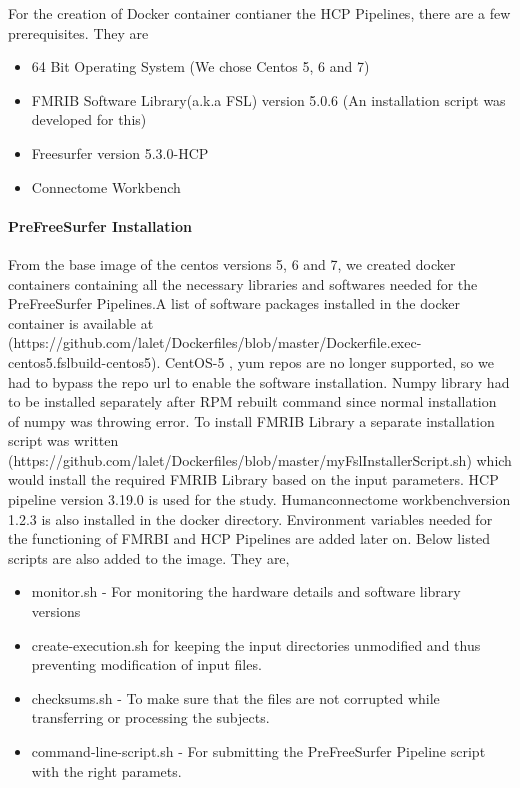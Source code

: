 \documentclass{article}
\begin{document}
For the creation of Docker container contianer the HCP Pipelines, there are a few prerequisites. They are

\begin{itemize}
  \item 64 Bit Operating System (We chose Centos 5, 6 and 7)
  \item FMRIB Software Library(a.k.a FSL) version 5.0.6 (An installation script was developed for this)
  \item Freesurfer version 5.3.0-HCP
  \item Connectome Workbench
\end{itemize}

\paragraph{PreFreeSurfer Installation}
From the base image of the centos versions 5, 6 and 7, we created docker containers containing all the necessary libraries and softwares needed for the PreFreeSurfer Pipelines.A list of software packages installed in the docker container is available at (https://github.com/lalet/Dockerfiles/blob/master/Dockerfile.exec-centos5.fslbuild-centos5). CentOS-5 , yum repos are no longer supported, so we had to bypass the repo url to enable the software installation. Numpy library had to be installed separately after RPM rebuilt command since normal installation of numpy was throwing error. To install FMRIB Library a separate installation script was written (https://github.com/lalet/Dockerfiles/blob/master/myFslInstallerScript.sh) which would install the required FMRIB Library based on the input parameters. HCP pipeline version 3.19.0 is used for the study. Humanconnectome workbenchversion 1.2.3 is also installed in the docker directory. Environment variables needed for the functioning of FMRBI and HCP Pipelines are added later on.
Below listed scripts are also added to the image. They are,
\begin{itemize}
  \item monitor.sh - For monitoring the hardware details and software library versions
  \item create-execution.sh for keeping the input directories unmodified and thus preventing modification of input files.
  \item checksums.sh - To make sure that the files are not corrupted while transferring or processing the subjects.
  \item command-line-script.sh - For submitting the PreFreeSurfer Pipeline script with the right paramets.
\end{itemize}
\end{document}
